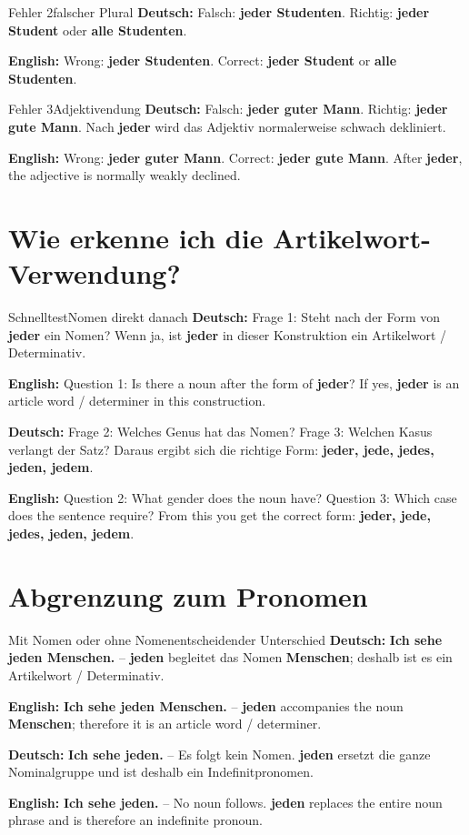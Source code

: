 \documentclass[a4paper,11pt]{article}
\newcommand{\GermanText}[1]{\textbf{Deutsch: }#1\par}
\newcommand{\EnglishText}[1]{{\small\color{SoftGray}\textbf{English: }#1\par}}
\begin{document}
\begin{grammarentry}{Fehler 2}{falscher Plural}
\GermanText{Falsch: \textbf{jeder Studenten}. Richtig: \textbf{jeder Student} oder \textbf{alle Studenten}.}
\EnglishText{Wrong: \textbf{jeder Studenten}. Correct: \textbf{jeder Student} or \textbf{alle Studenten}.}
\end{grammarentry}

\begin{grammarentry}{Fehler 3}{Adjektivendung}
\GermanText{Falsch: \textbf{jeder guter Mann}. Richtig: \textbf{jeder gute Mann}. Nach \textbf{jeder} wird das Adjektiv normalerweise schwach dekliniert.}
\EnglishText{Wrong: \textbf{jeder guter Mann}. Correct: \textbf{jeder gute Mann}. After \textbf{jeder}, the adjective is normally weakly declined.}
\end{grammarentry}

\section{Wie erkenne ich die Artikelwort-Verwendung?}
\begin{grammarentry}{Schnelltest}{Nomen direkt danach}
\GermanText{Frage 1: Steht nach der Form von \textbf{jeder} ein Nomen? Wenn ja, ist \textbf{jeder} in dieser Konstruktion ein Artikelwort / Determinativ.}
\EnglishText{Question 1: Is there a noun after the form of \textbf{jeder}? If yes, \textbf{jeder} is an article word / determiner in this construction.}
\GermanText{Frage 2: Welches Genus hat das Nomen? Frage 3: Welchen Kasus verlangt der Satz? Daraus ergibt sich die richtige Form: \textbf{jeder, jede, jedes, jeden, jedem}.}
\EnglishText{Question 2: What gender does the noun have? Question 3: Which case does the sentence require? From this you get the correct form: \textbf{jeder, jede, jedes, jeden, jedem}.}
\end{grammarentry}

\section{Abgrenzung zum Pronomen}
\begin{grammarentry}{Mit Nomen oder ohne Nomen}{entscheidender Unterschied}
\GermanText{\textbf{Ich sehe jeden Menschen.} -- \textbf{jeden} begleitet das Nomen \textbf{Menschen}; deshalb ist es ein Artikelwort / Determinativ.}
\EnglishText{\textbf{Ich sehe jeden Menschen.} -- \textbf{jeden} accompanies the noun \textbf{Menschen}; therefore it is an article word / determiner.}
\GermanText{\textbf{Ich sehe jeden.} -- Es folgt kein Nomen. \textbf{jeden} ersetzt die ganze Nominalgruppe und ist deshalb ein Indefinitpronomen.}
\EnglishText{\textbf{Ich sehe jeden.} -- No noun follows. \textbf{jeden} replaces the entire noun phrase and is therefore an indefinite pronoun.}
\end{grammarentry}
\end{document}
